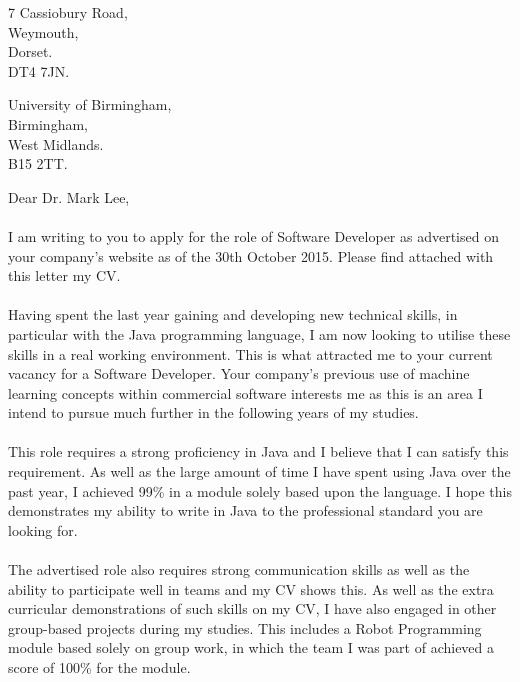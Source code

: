 \documentclass[12pt]{article}
\begin{document}

	\begin{flushright}
		7 Cassiobury Road,\\
		Weymouth,\\
		Dorset.\\
		DT4 7JN.
	\end{flushright}

	\begin{flushleft}
		University of Birmingham,\\
		Birmingham,\\
		West Midlands.\\
		B15 2TT.
	\end{flushleft}

	\begin{flushleft}
		Dear Dr. Mark Lee, 
		\paragraph{}
			I am writing to you to apply for the role of Software Developer as advertised on your company's website as of the 30th October 2015. Please find attached with this letter my CV.
	
		\paragraph{}
			Having spent the last year gaining and developing new technical skills, in particular with the Java programming language, I am now looking to utilise these skills in a real working environment. This is what attracted me to your current vacancy for a Software Developer. Your company's previous use of machine learning concepts within commercial software interests me as this is an area I intend to pursue much further in the following years of my studies.

		\paragraph{}
			This role requires a strong proficiency in Java and I believe that I can satisfy this requirement. As well as the large amount of time I have spent using Java over the past year, I achieved 99\% in a module solely based upon the language. I hope this demonstrates my ability to write in Java to the professional standard you are looking for.

		\paragraph{}
			The advertised role also requires strong communication skills as well as the ability to participate well in teams and my CV shows this. As well as the extra curricular demonstrations of such skills on my CV, I have also engaged in other group-based projects during my studies. This includes a Robot Programming module based solely on group work, in which the team I was part of achieved a score of 100\% for the module.


\end{flushleft}
\end{document}
